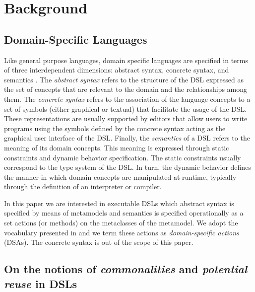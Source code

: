 \section{Background}
\label{sec:background}

\subsection{Domain-Specific Languages}

Like general purpose languages, domain specific languages are specified in terms of three interdependent dimensions: abstract syntax, concrete syntax, and semantics \cite{Harel:2004b}. The \textit{abstract syntax} refers to the structure of the DSL expressed as the set of concepts that are relevant to the domain and the relationships among them. The \textit{concrete syntax} refers to the association of the language concepts to a set of symbols (either graphical or textual) that facilitate the usage of the DSL. These representations are usually supported by editors that allow users to write programs using the symbols defined by the concrete syntax acting as the graphical user interface of the DSL. Finally, the \textit{semantics} of a DSL refers to the meaning of its domain concepts. This meaning is expressed through static constraints and dynamic behavior specification. The static constraints usually correspond to the type system of the DSL. In turn, the dynamic behavior defines the manner in which domain concepts are manipulated at runtime, typically through the definition of an interpreter or compiler.

In this paper we are interested in executable DSLs which abstract syntax is specified by means of metamodels and semantics is specified operationally as a set actions (or methods) on the metaclasses of the metamodel. We adopt the vocabulary presented in \cite{Combemale:2013} and we term these actions as \textit{domain-specific actions} (DSAs). The concrete syntax is out of the scope of this paper. 


\subsection{On the notions of \textit{commonalities} and \textit{potential reuse} in DSLs}

